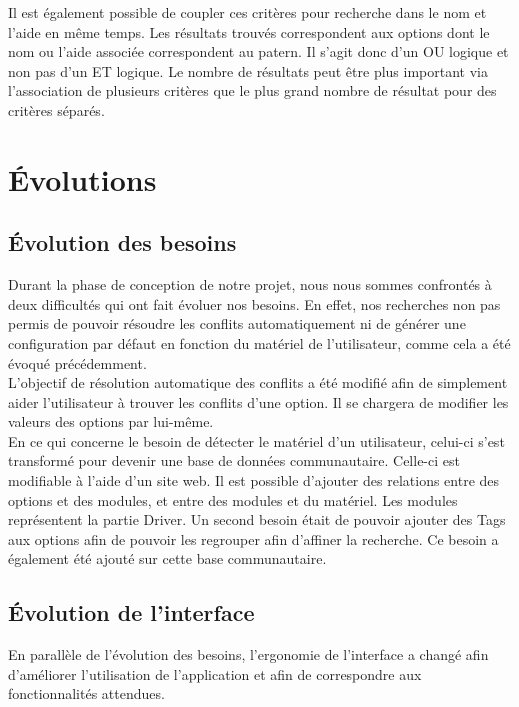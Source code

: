 \documentclass[17pts]{report}
\begin{document}
Il est également possible de coupler ces critères pour recherche dans le nom et 
l'aide en même temps. Les résultats trouvés correspondent aux options dont le
nom ou l'aide associée correspondent au patern. Il s'agit donc d'un OU logique
et non pas d'un ET logique. Le nombre de résultats peut être plus important via
l'association de plusieurs critères que le plus grand nombre de résultat pour 
des critères séparés.\\

\section{Évolutions}
\label{sec:Évolutions}
\subsection{Évolution des besoins}
\label{sub:Évolution des besoins}

Durant la phase de conception de notre projet, nous nous sommes confrontés à
deux difficultés qui ont fait évoluer nos besoins. En effet, nos recherches non
pas permis de pouvoir résoudre les conflits automatiquement ni de générer une
configuration par défaut en fonction du matériel de l'utilisateur, comme cela a
été évoqué précédemment.  \\

L'objectif de résolution automatique des conflits a été modifié afin de
simplement aider l'utilisateur à trouver les conflits d'une option. Il se
chargera de modifier les valeurs des options par lui-même.  \\

En ce qui concerne le besoin de détecter le matériel d'un utilisateur, celui-ci
s'est transformé pour devenir une base de données communautaire. Celle-ci est
modifiable à l'aide d'un site web. Il est possible d'ajouter des relations
entre des options et des modules, et entre des modules et du matériel. Les
modules représentent la partie Driver. Un second besoin était de pouvoir
ajouter des Tags aux options afin de pouvoir les regrouper afin d'affiner la
recherche. Ce besoin a également été ajouté sur cette base communautaire.

\subsection{Évolution de l'interface}
\label{sub:Évolution de l'interface}
En parallèle de l'évolution des besoins, l'ergonomie de l'interface a changé
afin d'améliorer l'utilisation de l'application et afin de correspondre aux
fonctionnalités attendues.
\end{document}
